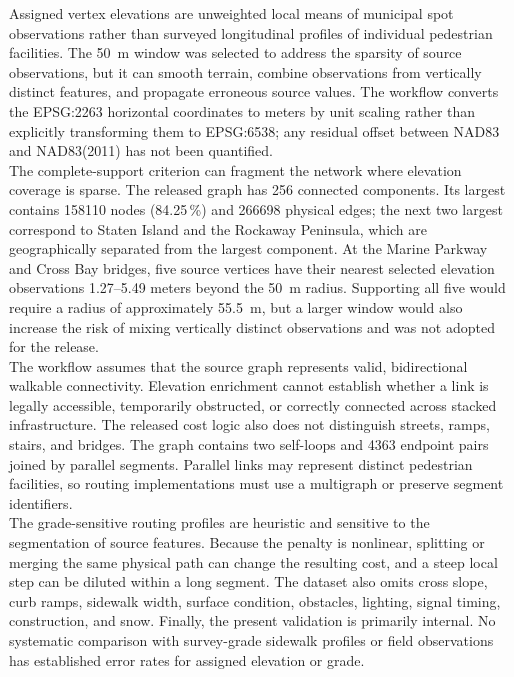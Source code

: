 \documentclass[twocolumn,10pt]{article}
\newcommand{\pct}{\,\%\xspace}
\begin{document}
Assigned vertex elevations are unweighted local means of municipal spot observations rather than surveyed longitudinal profiles of individual pedestrian facilities. The \SI{50}{\meter} window was selected to address the sparsity of source observations, but it can smooth terrain, combine observations from vertically distinct features, and propagate erroneous source values. The workflow converts the EPSG:2263 horizontal coordinates to meters by unit scaling rather than explicitly transforming them to EPSG:6538; any residual offset between NAD83 and NAD83(2011) has not been quantified.
\\
The complete-support criterion can fragment the network where elevation coverage is sparse. The released graph has 256 connected components. Its largest contains \num{158110} nodes (84.25\pct) and \num{266698} physical edges; the next two largest correspond to Staten Island and the Rockaway Peninsula, which are geographically separated from the largest component. At the Marine Parkway and Cross Bay bridges, five source vertices have their nearest selected elevation observations 1.27--5.49 meters beyond the \SI{50}{\meter} radius. Supporting all five would require a radius of approximately \SI{55.5}{\meter}, but a larger window would also increase the risk of mixing vertically distinct observations and was not adopted for the release.
\\
The workflow assumes that the source graph represents valid, bidirectional walkable connectivity. Elevation enrichment cannot establish whether a link is legally accessible, temporarily obstructed, or correctly connected across stacked infrastructure. The released cost logic also does not distinguish streets, ramps, stairs, and bridges. The graph contains two self-loops and \num{4363} endpoint pairs joined by parallel segments. Parallel links may represent distinct pedestrian facilities, so routing implementations must use a multigraph or preserve segment identifiers.
\\
The grade-sensitive routing profiles are heuristic and sensitive to the segmentation of source features. Because the penalty is nonlinear, splitting or merging the same physical path can change the resulting cost, and a steep local step can be diluted within a long segment. The dataset also omits cross slope, curb ramps, sidewalk width, surface condition, obstacles, lighting, signal timing, construction, and snow. Finally, the present validation is primarily internal. No systematic comparison with survey-grade sidewalk profiles or field observations has established error rates for assigned elevation or grade.
\end{document}
